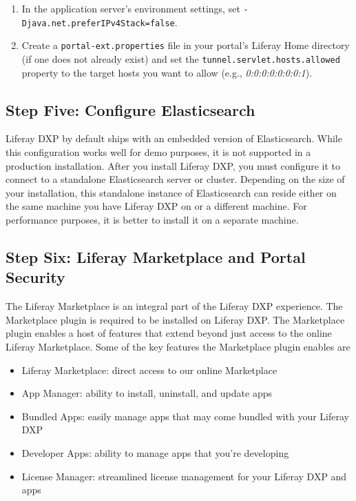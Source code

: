 \begin{enumerate}
\def\labelenumi{\arabic{enumi}.}
\item
  In the application server's environment settings, set
  \texttt{-Djava.net.preferIPv4Stack=false}.
\item
  Create a \texttt{portal-ext.properties} file in your portal's Liferay
  Home directory (if one does not already exist) and set the
  \texttt{tunnel.servlet.hosts.allowed} property to the target hosts you
  want to allow (e.g., \emph{0:0:0:0:0:0:0:1}).
\end{enumerate}

\subsection{Step Five: Configure
Elasticsearch}\label{step-five-configure-elasticsearch}

Liferay DXP by default ships with an embedded version of Elasticsearch.
While this configuration works well for demo purposes, it is not
supported in a production installation. After you install Liferay DXP,
you must configure it to connect to a standalone Elasticsearch server or
cluster. Depending on the size of your installation, this standalone
instance of Elasticsearch can reside either on the same machine you have
Liferay DXP on or a different machine. For performance purposes, it is
better to install it on a separate machine.

\subsection{Step Six: Liferay Marketplace and Portal
Security}\label{step-six-liferay-marketplace-and-portal-security}

The Liferay Marketplace is an integral part of the Liferay DXP
experience. The Marketplace plugin is required to be installed on
Liferay DXP. The Marketplace plugin enables a host of features that
extend beyond just access to the online Liferay Marketplace. Some of the
key features the Marketplace plugin enables are

\begin{itemize}
\tightlist
\item
  Liferay Marketplace: direct access to our online Marketplace
\item
  App Manager: ability to install, uninstall, and update apps
\item
  Bundled Apps: easily manage apps that may come bundled with your
  Liferay DXP
\item
  Developer Apps: ability to manage apps that you're developing
\item
  License Manager: streamlined license management for your Liferay DXP
  and apps
\end{itemize}


